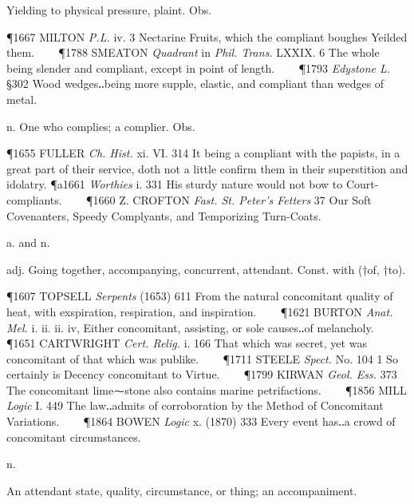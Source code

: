 \begin{description}[wide, labelwidth=!, labelindent=0pt]
\begin{myenumerate}
 Yielding to physical pressure, plaint. Obs.

\P 1667 MILTON  \textit{P.L.} iv. 3 Nectarine Fruits, which the compliant boughes Yeilded them.    
\P 1788 SMEATON  \textit{Quadrant} in \textit{Phil. Trans.} LXXIX. 6 The whole being slender and compliant, except in point of length.    
\P 1793 \textit{Edystone L.} §302 Wood wedges‥being more supple, elastic, and compliant than wedges of metal.

 n. One who complies; a complier. Obs.

\P 1655 FULLER  \textit{Ch. Hist.} xi. VI. 314 It being a compliant with the papists, in a great part of their service, doth not a little confirm them in their superstition and idolatry.
\P a1661 \textit{Worthies} i. 331 His sturdy nature would not bow to Court-compliants.    
\P 1660 Z. CROFTON  \textit{Fast. St. Peter's Fetters} 37 Our Soft Covenanters, Speedy Complyants, and Temporizing Turn-Coats.
\end{myenumerate}


 a. and n.

\noindent {}

\vspace{-0.3cm}

\begin{myenumerate}

 adj. Going together, accompanying, concurrent, attendant. Const. with (†of, †to).

\P 1607 TOPSELL  \textit{Serpents} (1653) 611 From the natural concomitant quality of heat, with exspiration, respiration, and inspiration.    
\P 1621 BURTON  \textit{Anat. Mel.} i. ii. ii. iv, Either concomitant, assisting, or sole causes‥of melancholy.    
\P 1651 CARTWRIGHT  \textit{Cert. Relig.} i. 166 That which was secret, yet was concomitant of that which was publike.    
\P 1711 STEELE  \textit{Spect.} No. 104 1 So certainly is Decency concomitant to Virtue.    
\P 1799 KIRWAN  \textit{Geol. Ess.} 373 The concomitant lime⁓stone also contains marine petrifactions.    
\P 1856 MILL  \textit{Logic} I. 449 The law‥admits of corroboration by the Method of Concomitant Variations.    
\P 1864 BOWEN  \textit{Logic} x. (1870) 333 Every event has‥a crowd of concomitant circumstances.

 n.

 An attendant state, quality, circumstance, or thing; an accompaniment.


\end{myenumerate}
\end{description}
